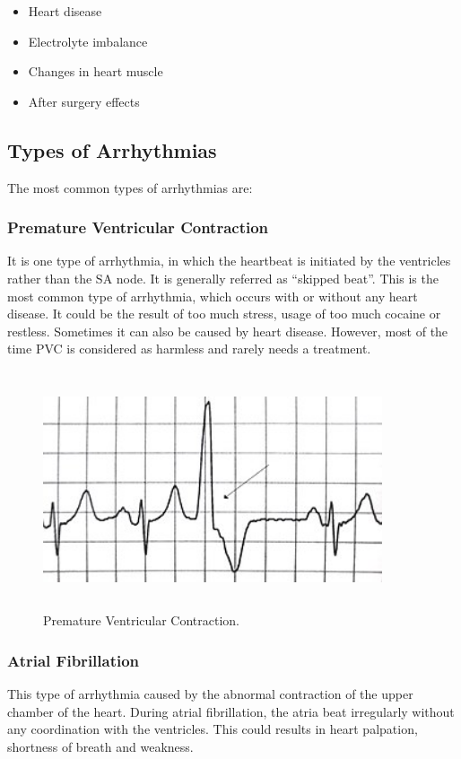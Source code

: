 \begin{itemize}
	\item Heart disease
	\item Electrolyte imbalance
	\item Changes in heart muscle
	\item After surgery effects
\end{itemize}

\subsection{Types of Arrhythmias}

The most common types of arrhythmias are:

\subsubsection{Premature Ventricular Contraction}
It is one type of arrhythmia, in which the heartbeat is initiated by the ventricles rather than the SA node. It is generally referred as ``skipped beat''. This is the most common type of arrhythmia, which occurs with or without any heart disease. It could be the result of too much stress, usage of too much cocaine or restless. Sometimes it can also be caused by heart disease. However, most of the time PVC is considered as harmless and rarely needs a treatment.

\begin{figure}[htpb]
	\centering
	\includegraphics[width=10cm,height=7cm,keepaspectratio=true]{images/pvc}
	\caption{
		Premature Ventricular Contraction\cite{wiki:pvc}.
	}
	\label{fig:pvc}
\end{figure}

\subsubsection{Atrial Fibrillation}
This type of arrhythmia caused by the abnormal contraction of the upper chamber of the heart. During atrial fibrillation, the atria beat irregularly without any coordination with the ventricles. This could results in heart palpation, shortness of breath and weakness.


